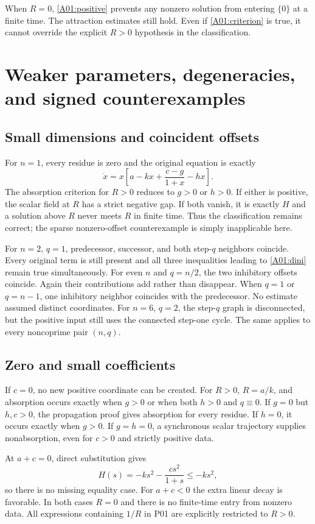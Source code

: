\documentclass[11pt]{article}
\begin{document}
When $R=0$, \eqref{A01:positive} prevents any nonzero solution from
entering $\{0\}$ at a finite time. The attraction estimates still hold.
Even if \eqref{A01:criterion} is true, it cannot override the explicit
$R>0$ hypothesis in the classification.

\section{Weaker parameters, degeneracies, and signed counterexamples}

\subsection{Small dimensions and coincident offsets}
For $n=1$, every residue is zero and the original equation is exactly
\[
 \dot x=x\left[a-kx+\frac{c-g}{1+x}-hx\right].
\]
The absorption criterion for $R>0$ reduces to $g>0$ or $h>0$.
If either is positive, the scalar field at $R$ has a strict negative
gap. If both vanish, it is exactly $H$ and a solution above $R$ never
meets $R$ in finite time. Thus the classification remains correct;
the sparse nonzero-offset counterexample is simply inapplicable here.

For $n=2$, $q=1$, predecessor, successor, and both step-$q$ neighbors
coincide. Every original term is still present and all three inequalities
leading to \eqref{A01:dini} remain true simultaneously. For even $n$
and $q=n/2$, the two inhibitory offsets coincide. Again their contributions
add rather than disappear. When $q=1$ or $q=n-1$, one inhibitory neighbor
coincides with the predecessor. No estimate assumed distinct coordinates.
For $n=6$, $q=2$, the step-$q$ graph is disconnected, but the positive
input still uses the connected step-one cycle. The same applies to
every noncoprime pair $(n,q)$.

\subsection{Zero and small coefficients}
If $c=0$, no new positive coordinate can be created. For $R>0$,
$R=a/k$, and absorption occurs exactly when $g>0$ or when both $h>0$
and $q\equiv0$. If $g=0$ but $h,c>0$, the propagation proof gives
absorption for every residue. If $h=0$, it occurs exactly when $g>0$.
If $g=h=0$, a synchronous scalar trajectory supplies nonabsorption,
even for $c>0$ and strictly positive data.

At $a+c=0$, direct substitution gives
\[
 H(s)=-ks^2-\frac{cs^2}{1+s}\leq-ks^2,
\]
so there is no missing equality case. For $a+c<0$ the extra linear
decay is favorable. In both cases $R=0$ and there is no finite-time
entry from nonzero data. All expressions containing $1/R$ in P01 are
explicitly restricted to $R>0$.
\end{document}
